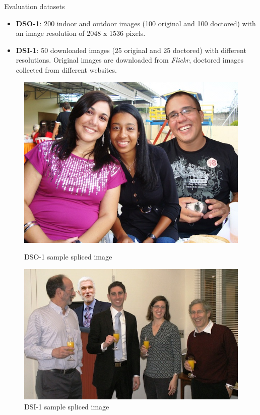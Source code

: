 \begin{tframe}{Evaluation datasets}
\begin{itemize}
\item \textbf{DSO-1}: 200 indoor and outdoor images (100 original and 100 doctored) with an image resolution of 2048 x 1536 pixels.
\vspace{0.1cm}
\item \textbf{DSI-1}: 50 downloaded images (25 original and 25 doctored) with different resolutions. Original images are downloaded from \emph{Flickr}, doctored images collected from different websites.
\end{itemize}
\begin{figure}[!htb]
\centering
  \includegraphics[width=0.6\linewidth]{images/dso_sample_spliced}
  \caption{DSO-1 sample spliced image}\label{fig:dsoimage}
\endminipage\hfill
{}
\centering
  \includegraphics[width=0.7\linewidth]{images/dsi_sample_spliced}
  \caption{DSI-1 sample spliced image}\label{fig:dsiimage}
\endminipage
\end{figure}

\end{tframe}

